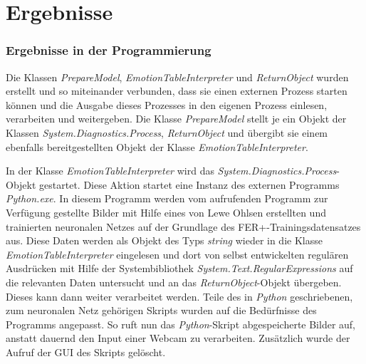 \documentclass[10pt,a4paper]{report}
\begin{document}
\section{Ergebnisse}
\subsubsection{Ergebnisse in der Programmierung}
Die Klassen \textit{PrepareModel}, \textit{EmotionTableInterpreter} und \textit{ReturnObject} wurden erstellt und so miteinander verbunden, dass sie einen externen Prozess starten k\"{o}nnen und die Ausgabe dieses Prozesses in den eigenen Prozess einlesen, verarbeiten und weitergeben. Die Klasse \textit{PrepareModel} stellt je ein Objekt der Klassen \textit{System.Diagnostics.Process},  \textit{ReturnObject} und \"{u}bergibt sie einem ebenfalls bereitgestellten Objekt der Klasse  \textit{EmotionTableInterpreter}.

In der Klasse \textit{EmotionTableInterpreter} wird das \textit{System.Diagnostics.Process}-Objekt gestartet. Diese Aktion startet eine Instanz des externen Programms \textit{Python.exe}. In diesem Programm werden vom aufrufenden Programm zur Verf\"{u}gung gestellte Bilder mit Hilfe eines von Lewe Ohlsen \cite{LeweOhlsen} erstellten und trainierten neuronalen Netzes auf der Grundlage des FER+-Trainingsdatensatzes aus. Diese Daten werden als Objekt des Typs \textit{string} wieder in die Klasse \textit{EmotionTableInterpreter} eingelesen und dort von selbst entwickelten regul\"{a}ren Ausdr\"{u}cken mit Hilfe der Systembibliothek \textit{System.Text.RegularExpressions} auf die relevanten Daten untersucht und an das \textit{ReturnObject}-Objekt \"{u}bergeben. Dieses kann dann weiter verarbeitet werden. Teile des in \textit{Python} geschriebenen, zum neuronalen Netz geh\"{o}rigen Skripts wurden auf die Bed\"{u}rfnisse des Programms angepasst. So ruft nun das \textit{Python}-Skript abgespeicherte Bilder auf, anstatt dauernd den Input einer Webcam zu verarbeiten. Zus\"{a}tzlich wurde der Aufruf der GUI des Skripts gel\"{o}scht.
\end{document}
